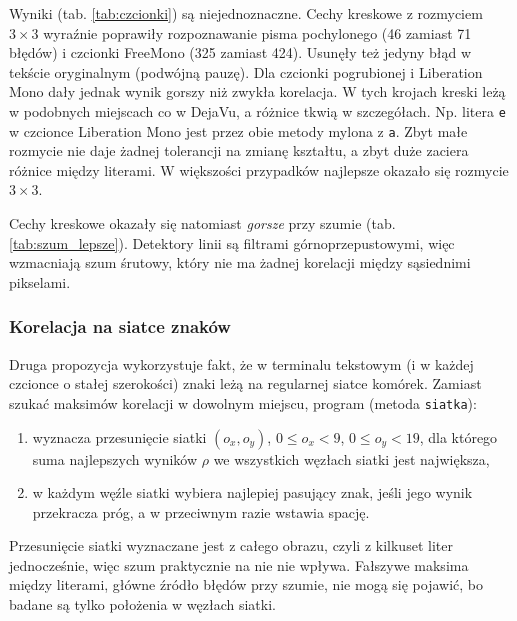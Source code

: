 \documentclass[12pt]{article}
\begin{document}
Wyniki (tab. \ref{tab:czcionki}) są niejednoznaczne. Cechy kreskowe z rozmyciem $3\times3$ wyraźnie poprawiły rozpoznawanie pisma pochylonego (46 zamiast 71 błędów) i czcionki FreeMono (325 zamiast 424). Usunęły też jedyny błąd w tekście oryginalnym (podwójną pauzę). Dla czcionki pogrubionej i Liberation Mono dały jednak wynik gorszy niż zwykła korelacja. W tych krojach kreski leżą w podobnych miejscach co w DejaVu, a różnice tkwią w szczegółach. Np. litera \texttt{e} w czcionce Liberation Mono jest przez obie metody mylona z \texttt{a}. Zbyt małe rozmycie nie daje żadnej tolerancji na zmianę kształtu, a zbyt duże zaciera różnice między literami. W większości przypadków najlepsze okazało się rozmycie $3\times3$.

Cechy kreskowe okazały się natomiast \emph{gorsze} przy szumie (tab. \ref{tab:szum_lepsze}). Detektory linii są filtrami górnoprzepustowymi, więc wzmacniają szum śrutowy, który nie ma żadnej korelacji między sąsiednimi pikselami.

\subsubsection{Korelacja na siatce znaków}

Druga propozycja wykorzystuje fakt, że w terminalu tekstowym (i w każdej czcionce o stałej szerokości) znaki leżą na regularnej siatce komórek. Zamiast szukać maksimów korelacji w dowolnym miejscu, program (metoda \texttt{siatka}):
\begin{enumerate}
    \item wyznacza przesunięcie siatki $(o_x, o_y)$, $0 \leq o_x < 9$, $0 \leq o_y < 19$, dla którego suma najlepszych wyników $\rho$ we wszystkich węzłach siatki jest największa,
    \item w każdym węźle siatki wybiera najlepiej pasujący znak, jeśli jego wynik przekracza próg, a w przeciwnym razie wstawia spację.
\end{enumerate}
Przesunięcie siatki wyznaczane jest z całego obrazu, czyli z kilkuset liter jednocześnie, więc szum praktycznie na nie nie wpływa. Fałszywe maksima między literami, główne źródło błędów przy szumie, nie mogą się pojawić, bo badane są tylko położenia w węzłach siatki.
\end{document}
